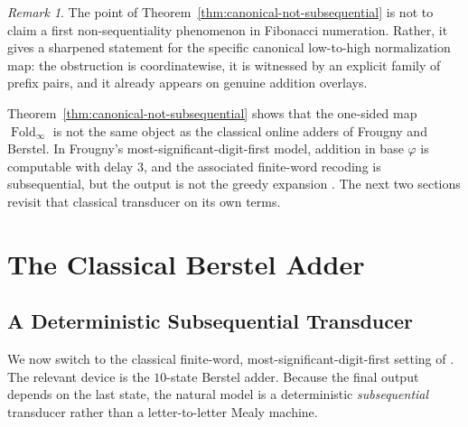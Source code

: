 \documentclass[11pt,letterpaper]{article}
\numberwithin{equation}{section}
\theoremstyle{plain}
\theoremstyle{definition}
\theoremstyle{remark}
\newtheorem{remark}[theorem]{Remark}
\DeclareMathOperator{\Fold}{Fold}
\begin{document}
\begin{remark}\label{rem:frougny-separation}
The point of Theorem~\ref{thm:canonical-not-subsequential} is not to claim a
first non-sequentiality phenomenon in Fibonacci numeration.  Rather, it gives
a sharpened statement for the specific canonical low-to-high normalization map:
the obstruction is coordinatewise, it is witnessed by an explicit family of
prefix pairs, and it already appears on genuine addition overlays.
\par
Theorem~\ref{thm:canonical-not-subsequential} shows that the one-sided map
$\Fold_\infty$ is not the same object as the classical online adders of
Frougny and Berstel.  In Frougny's most-significant-digit-first model,
addition in base $\varphi$ is computable with delay $3$, and the associated
finite-word recoding is subsequential, but the output is not the greedy
expansion \cite[Prop.~13]{Frougny1999OnlineAddition}.  The next two sections
revisit that classical transducer on its own terms.
\end{remark}

\section{The Classical Berstel Adder}\label{sec:kernel}

\subsection{A Deterministic Subsequential Transducer}

We now switch to the classical finite-word, most-significant-digit-first
setting of \cite{Frougny1999OnlineAddition,LabbeLepsova2023FibonacciTwosComplement}.
The relevant device is the $10$-state Berstel adder.  Because the final output
depends on the last state, the natural model is a deterministic
\emph{subsequential} transducer rather than a letter-to-letter Mealy machine.
\end{document}

